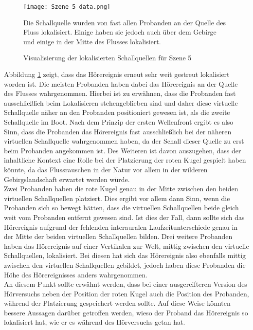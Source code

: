 \begin{figure}[H]
\centering
\texttt{[image: Szene\_5\_data.png]}
\caption{Visualisierung der lokalisierten Schallquellen für Szene 5}
Die Schallquelle wurden von fast allen Probanden an der Quelle des Fluss lokalisiert. Einige haben sie jedoch auch über dem Gebirge und einige in der Mitte des Flusses lokalisiert. 
\label{fig:Szene_5_data}
\end{figure} 
\vspace*{30pt}
Abbildung \ref{fig:Szene_5_data} zeigt, dass das Hörereignis erneut sehr weit gestreut lokalisiert worden ist. Die meisten Probanden haben dabei das Hörereignis an der Quelle des Flusses wahrgenommen. Hierbei ist zu erwähnen, dass die Probanden fast ausschließlich beim Lokalisieren stehengeblieben sind und daher diese virtuelle Schallquelle näher an den Probanden positioniert gewesen ist, als die zweite Schallquelle im Boot. Nach dem Prinzip der ersten Wellenfront ergibt es also Sinn, dass die Probanden das Hörereignis fast ausschließlich bei der näheren virtuellen Schallquelle wahrgenommen haben, da der Schall dieser Quelle zu erst beim Probanden angekommen ist. Des Weiteren ist davon auszugehen, dass der inhaltliche Kontext eine Rolle bei der Platzierung der roten Kugel gespielt haben könnte, da das Flussrauschen in der Natur vor allem in der wilderen Gebirgslandschaft erwartet werden würde.\\

Zwei Probanden haben die rote Kugel genau in der Mitte zwischen den beiden virtuellen Schallquellen platziert. Dies ergibt vor allem dann Sinn, wenn die Probanden sich so bewegt hätten, dass die virtuellen Schallquellen beide gleich weit vom Probanden entfernt gewesen sind. Ist dies der Fall, dann sollte sich das Hörereignis aufgrund der fehlenden interauralen Laufzeitunterschiede genau in der Mitte der beiden virtuellen Schallquellen bilden. Drei weitere Probanden haben das Hörereignis auf einer Vertikalen zur Welt, mittig zwischen den virtuelle Schallquellen, lokalisiert. Bei diesen hat sich das Hörereignis also ebenfalls mittig zwischen den virtuellen Schallquellen gebildet, jedoch haben diese Probanden die Höhe des Hörereignisses anders wahrgenommen.\\ 

An diesem Punkt sollte erwähnt werden, dass bei einer ausgereifteren Version des Hörversuchs neben der Position der roten Kugel auch die Position des Probanden, während der Platzierung gespeichert werden sollte. Auf diese Weise könnten bessere Aussagen darüber getroffen werden, wieso der Proband das Hörereignis so lokalisiert hat, wie er es während des Hörversuchs getan hat. 

